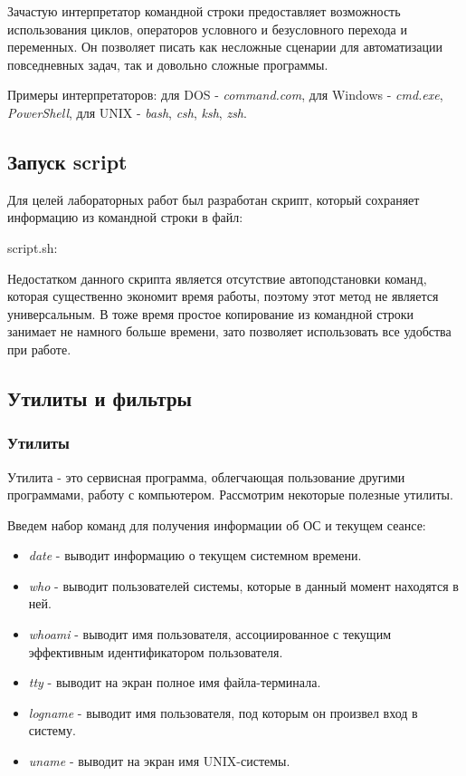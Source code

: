 \documentclass[14pt,a4paper,report]{report}
\begin{document}
Зачастую интерпретатор командной строки предоставляет возможность использования циклов, операторов условного и безусловного перехода и переменных. Он позволяет писать как несложные сценарии для автоматизации повседневных задач, так и довольно сложные программы.

Примеры интерпретаторов: для DOS - \emph{command.com}, для Windows - \emph{cmd.exe}, \emph{PowerShell}, для UNIX - \emph{bash}, \emph{csh}, \emph{ksh}, \emph{zsh}.

\subsection{Запуск script}

Для целей лабораторных работ был разработан скрипт, который сохраняет информацию из командной строки в файл:

script.sh:



Недостатком данного скрипта является отсутствие автоподстановки команд, которая существенно экономит время работы, поэтому этот метод не является универсальным. В тоже время простое копирование из командной строки занимает не намного больше времени, зато позволяет использовать все удобства при работе.

\subsection{Утилиты и фильтры}

\subsubsection{Утилиты}

Утилита - это сервисная программа, облегчающая пользование другими программами, работу с компьютером. Рассмотрим некоторые полезные утилиты.

Введем набор команд для получения информации об ОС и текущем сеансе:



\begin{itemize}
	\item \emph{date} - выводит информацию о текущем системном времени.
	\item \emph{who} - выводит пользователей системы, которые в данный момент находятся в ней.
	\item \emph{whoami} - выводит имя пользователя, ассоциированное с текущим эффективным идентификатором пользователя.
	\item \emph{tty} - выводит на экран полное имя файла-терминала.
	\item \emph{logname} - выводит имя пользователя, под которым он произвел вход в систему.
	\item \emph{uname} - выводит на экран имя UNIX-системы. 
\end{itemize}
\end{document}
